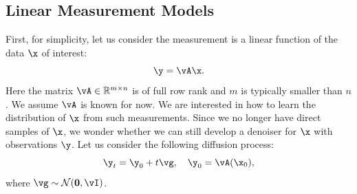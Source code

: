 \documentclass[../../book-main.tex]{subfiles}
\begin{document}


\subsection{Linear Measurement Models}
First, for simplicity, let us consider the measurement is a linear function of the data $\x$ of interest:
\begin{equation}
    \y = \vA\x.
\end{equation}
Here the matrix $\vA \in \mathbb{R}^{m\times n}$ is of full row rank and $m$ is typically smaller than $n$. We assume $\vA$ is known for now. We are interested in how to learn the distribution of $\x$ from such measurements. Since we no longer have direct samples of $\x$, we wonder whether we can still develop a denoiser for $\x$ with observations $\y$. Let us consider the following diffusion process:
\begin{equation}
    \y_t = \y_0 + t \vg, \quad \y_0 = \vA(\x_0), 
\end{equation}
where $\vg \sim \mathcal{N}(\boldsymbol{0}, \vI)$. 
\end{document}
